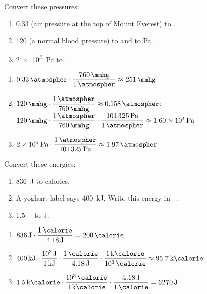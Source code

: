\begin{exercise}
    Convert these pressures:
    \begin{enumerate}[label=\letraminuscula]
        \item \qty{0.33}{\atmospher} (air pressure at the top of Mount Everest) to \unit{\mmhg}.
        \item \qty{120}{\mmhg} (a normal blood pressure) to \unit{\atmospher} and to \unit{\Pa}.
        \item \qty{2e5}{\Pa} to \unit{\atmospher}.
    \end{enumerate}
    \begin{solu}
        \begin{enumerate}[label=\alph*)]
            \item \(\num{0.33}\,\unit{\atmospher} \cdot \dfrac{\qty{760}{\mmhg}}{\qty{1}{\atmospher}} \approx \qty{251}{\mmhg}\)
            \item \(\num{120}\,\unit{\mmhg} \cdot \dfrac{\qty{1}{\atmospher}}{\qty{760}{\mmhg}} \approx \qty{0.158}{\atmospher}\); \quad
            \(\num{120}\,\unit{\mmhg} \cdot \dfrac{\qty{1}{\atmospher}}{\qty{760}{\mmhg}} \cdot \dfrac{\qty{101325}{\Pa}}{\qty{1}{\atmospher}} \approx \qty{1.60e4}{\Pa}\)
            \item \(\num{2e5}\,\unit{\Pa} \cdot \dfrac{\qty{1}{\atmospher}}{\qty{101325}{\Pa}} \approx \qty{1.97}{\atmospher}\)
        \end{enumerate}
    \end{solu}
\end{exercise}

\begin{exercise}
    Convert these energies:
    \begin{enumerate}[label=\letraminuscula]
        \item \qty{836}{\J} to calories.
        \item A yoghurt label says \qty{400}{\kilo\joule}. Write this energy in \unit{\kilo\calorie}.
        \item \qty{1.5}{\kilo\calorie} to \unit{\J}.
    \end{enumerate}
    \begin{solu}
        \begin{enumerate}[label=\alph*)]
            \item \(\num{836}\,\unit{\J} \cdot \dfrac{\qty{1}{\calorie}}{\qty{4.18}{\J}} = \qty{200}{\calorie}\)
            \item \(\num{400}\,\unit{\kilo\joule} \cdot \dfrac{\qty{e3}{\J}}{\qty{1}{\kilo\joule}} \cdot \dfrac{\qty{1}{\calorie}}{\qty{4.18}{\J}} \cdot \dfrac{\qty{1}{\kilo\calorie}}{\qty{e3}{\calorie}} \approx \qty{95.7}{\kilo\calorie}\)
            \item \(\num{1.5}\,\unit{\kilo\calorie} \cdot \dfrac{\qty{e3}{\calorie}}{\qty{1}{\kilo\calorie}} \cdot \dfrac{\qty{4.18}{\J}}{\qty{1}{\calorie}} = \qty{6270}{\J}\)
        \end{enumerate}
    \end{solu}
\end{exercise}

